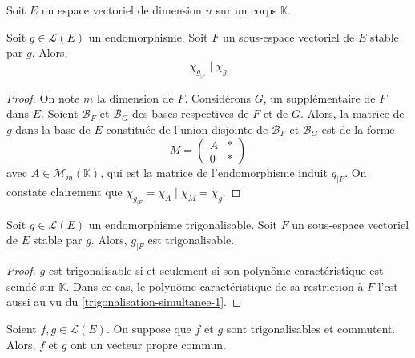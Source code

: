 





  Soit $E$ un espace vectoriel de dimension $n$ sur un corps $\mathbb{K}$.

  \begin{lemma}
    \label{trigonalisation-simultanee-1}
    Soit $g \in \mathcal{L}(E)$ un endomorphisme. Soit $F$ un sous-espace vectoriel de $E$ stable par $g$. Alors,
    \[ \chi_{g_{|F}} \mid \chi_{g} \]
  \end{lemma}

  \begin{proof}
    On note $m$ la dimension de $F$. Considérons $G$, un supplémentaire de $F$ dans $E$. Soient $\mathcal{B}_F$ et $\mathcal{B}_G$ des bases respectives de $F$ et de $G$. Alors, la matrice de $g$ dans la base de $E$ constituée de l'union disjointe de $\mathcal{B}_F$ et $\mathcal{B}_G$ est de la forme
    \[
    M =
    \begin{pmatrix}
      A & * \\
      0 & *
    \end{pmatrix}
    \]
    avec $A \in \mathcal{M}_m(\mathbb{K})$, qui est la matrice de l'endomorphisme induit $g_{|F}$. On constate clairement que $\chi_{g_{|F}} = \chi_A \mid \chi_M = \chi_g$.
  \end{proof}

  \begin{lemma}
    \label{trigonalisation-simultanee-2}
    Soit $g \in \mathcal{L}(E)$ un endomorphisme trigonalisable. Soit $F$ un sous-espace vectoriel de $E$ stable par $g$. Alors, $g_{|F}$ est trigonalisable.
  \end{lemma}

  \begin{proof}
    $g$ est trigonalisable si et seulement si son polynôme caractéristique est scindé sur $\mathbb{K}$. Dans ce cas, le polynôme caractéristique de sa restriction à $F$ l'est aussi au vu du \cref{trigonalisation-simultanee-1}.
  \end{proof}

  \begin{lemma}
    \label{trigonalisation-simultanee-3}
    Soient $f, g \in \mathcal{L}(E)$. On suppose que $f$ et $g$ sont trigonalisables et commutent. Alors, $f$ et $g$ ont un vecteur propre commun.
  \end{lemma}

